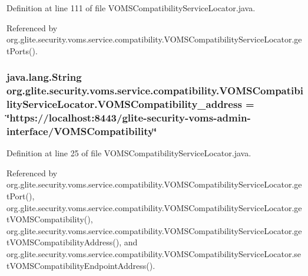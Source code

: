 Definition at line 111 of file VOMSCompatibilityServiceLocator.java.



Referenced by org.glite.security.voms.service.compatibility.VOMSCompatibilityServiceLocator.getPorts().

\hypertarget{classorg_1_1glite_1_1security_1_1voms_1_1service_1_1compatibility_1_1VOMSCompatibilityServiceLocator_a1ce23128367b21c3f65ae5f30ca92795}{
\subsubsection[{VOMSCompatibility\_\-address}]{\setlength{\rightskip}{0pt plus 5cm}java.lang.String {\bf org.glite.security.voms.service.compatibility.VOMSCompatibilityServiceLocator.VOMSCompatibility\_\-address} = \char`\"{}https://localhost:8443/glite-\/security-\/voms-\/admin-\/interface/{\bf VOMSCompatibility}\char`\"{}}}
\label{classorg_1_1glite_1_1security_1_1voms_1_1service_1_1compatibility_1_1VOMSCompatibilityServiceLocator_a1ce23128367b21c3f65ae5f30ca92795}


Definition at line 25 of file VOMSCompatibilityServiceLocator.java.



Referenced by org.glite.security.voms.service.compatibility.VOMSCompatibilityServiceLocator.getPort(), org.glite.security.voms.service.compatibility.VOMSCompatibilityServiceLocator.getVOMSCompatibility(), org.glite.security.voms.service.compatibility.VOMSCompatibilityServiceLocator.getVOMSCompatibilityAddress(), and org.glite.security.voms.service.compatibility.VOMSCompatibilityServiceLocator.setVOMSCompatibilityEndpointAddress().

